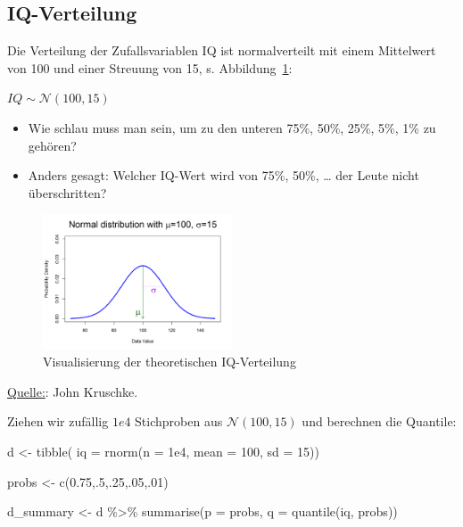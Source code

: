 \documentclass[
  a4paper,
  DIV=11]{scrreprt}
\newenvironment{Shaded}{\begin{snugshade}}{\end{snugshade}}
\newcommand{\AttributeTok}[1]{\textcolor[rgb]{0.40,0.45,0.13}{#1}}
\newcommand{\DecValTok}[1]{\textcolor[rgb]{0.68,0.00,0.00}{#1}}
\newcommand{\FloatTok}[1]{\textcolor[rgb]{0.68,0.00,0.00}{#1}}
\newcommand{\FunctionTok}[1]{\textcolor[rgb]{0.28,0.35,0.67}{#1}}
\newcommand{\NormalTok}[1]{\textcolor[rgb]{0.00,0.23,0.31}{#1}}
\newcommand{\OtherTok}[1]{\textcolor[rgb]{0.00,0.23,0.31}{#1}}
\newcommand{\SpecialCharTok}[1]{\textcolor[rgb]{0.37,0.37,0.37}{#1}}
\providecommand{\tightlist}{%
  \setlength{\itemsep}{0pt}\setlength{\parskip}{0pt}}\usepackage{longtable,booktabs,array}
\theoremstyle{definition}
\theoremstyle{remark}
\begin{document}
\hypertarget{iq-verteilung}{%
\subsection{IQ-Verteilung}\label{iq-verteilung}}

Die Verteilung der Zufallsvariablen IQ ist normalverteilt mit einem
Mittelwert von 100 und einer Streuung von 15, s.
Abbildung~\ref{fig-norm-100-15}:

\(IQ \sim \mathcal{N}(100,15)\)

\begin{itemize}
\tightlist
\item
  Wie schlau muss man sein, um zu den unteren 75\%, 50\%, 25\%, 5\%, 1\%
  zu gehören?
\item
  Anders gesagt: Welcher IQ-Wert wird von 75\%, 50\%, \ldots{} der Leute
  nicht überschritten?
\end{itemize}

\begin{figure}

{\centering \includegraphics[width=0.5\textwidth,height=\textheight]{./img/norm-100-15.png}

}

\caption{\label{fig-norm-100-15}Visualisierung der theoretischen
IQ-Verteilung}

\end{figure}

\href{https://jkkweb.sitehost.iu.edu/KruschkeFreqAndBayesAppTutorial.html\#data_are_described_by_mathematical_models}{Quelle:}:
John Kruschke.

Ziehen wir zufällig \(1e4\) Stichproben aus \(\mathcal{N}(100,15)\) und
berechnen die Quantile:

\begin{Shaded}
\begin{Highlighting}[]
\NormalTok{d }\OtherTok{\textless{}{-}}
  \FunctionTok{tibble}\NormalTok{(}
  \AttributeTok{iq =} \FunctionTok{rnorm}\NormalTok{(}\AttributeTok{n =} \FloatTok{1e4}\NormalTok{, }
             \AttributeTok{mean =} \DecValTok{100}\NormalTok{, }
             \AttributeTok{sd =} \DecValTok{15}\NormalTok{))}

\NormalTok{probs }\OtherTok{\textless{}{-}} \FunctionTok{c}\NormalTok{(}\FloatTok{0.75}\NormalTok{,.}\DecValTok{5}\NormalTok{,.}\DecValTok{25}\NormalTok{,.}\DecValTok{05}\NormalTok{,.}\DecValTok{01}\NormalTok{)}

\NormalTok{d\_summary }\OtherTok{\textless{}{-}}\NormalTok{ d }\SpecialCharTok{\%\textgreater{}\%} 
  \FunctionTok{summarise}\NormalTok{(}\AttributeTok{p =}\NormalTok{ probs,}
            \AttributeTok{q =} \FunctionTok{quantile}\NormalTok{(iq, probs))}
\end{Highlighting}
\end{Shaded}
\end{document}
